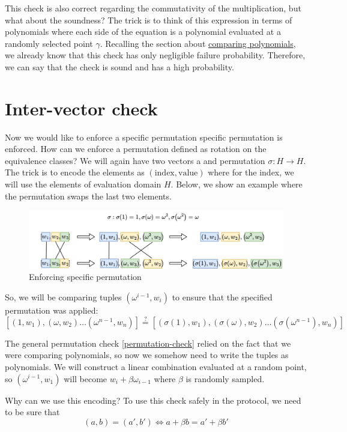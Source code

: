 This check is also correct regarding the commutativity of the multiplication, but what about the soundness? The trick is to think of this expression in terms of polynomials where each side of the equation is a polynomial evaluated at a randomly selected point $\gamma$. Recalling the section about \hyperref[comparing-poly]{comparing polynomials}, we already know that this check has only negligible failure probability. Therefore, we can say that the check is sound and has a high probability.

\section{Inter-vector check}
Now we would like to enforce a specific permutation specific permutation is enforced. How can we enforce a permutation defined as rotation on the equivalence classes? We will again have two vectors a and permutation $\sigma: H \rightarrow H$.  The trick is to encode the elements as $(\text{index}, \text{value})$ where for the index, we will use the elements of evaluation domain $H$. Below, we show an example where the permutation swaps the last two elements.

\begin{figure}[H]
    \centering
    \includegraphics[width=1\linewidth]{round-figures/round2/tuple_encoding.jpg}
    \caption{Enforcing specific permutation}
\end{figure}

So, we will be comparing tuples $(\omega^{i-1}, w_i)$ to ensure that the specified permutation was applied: $$[(1, w_1), (\omega, w_2) \ldots (\omega^{n-1}, w_n)] \stackrel{?}{=} [(\sigma(1), w_1), (\sigma(\omega), w_2) \ldots (\sigma(\omega^{n-1}), w_n)]$$

The general permutation check \ref{permutation-check} relied on the fact that we were comparing polynomials, so now we somehow need to write the tuples as polynomials. We will construct a linear combination evaluated at a random point, so $(\omega^{i-1}, w_1)$ will become $w_i + \beta \omega_{i-1}$ where $\beta$ is randomly sampled.


Why can we use this encoding?
To use this check safely in the protocol, we need to be sure that $$(a, b) = (a', b') \iff a + \beta b = a' + \beta b'$$

